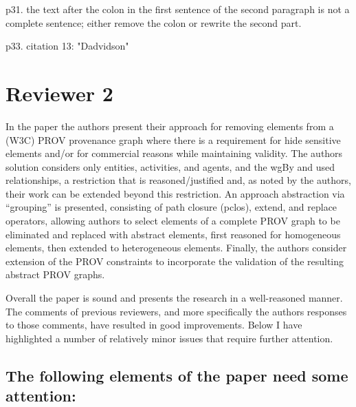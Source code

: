 \documentclass{article}
\begin{document}
p31. the text after the colon in the first sentence of the second paragraph is not a complete sentence; either remove the colon or rewrite the second part.

p33. citation 13: "Dadvidson"


\section*{Reviewer 2}


In the paper the authors present their approach for removing elements from a (W3C) PROV provenance graph where there is a requirement for hide sensitive elements and/or for commercial reasons while maintaining validity.  The authors solution considers only entities, activities, and agents, and the wgBy and used relationships, a restriction that is reasoned/justified and, as noted by the authors, their work can be extended beyond this restriction.  An approach abstraction via “grouping” is presented, consisting of path closure (pclos), extend, and replace operators, allowing authors to select elements of a complete PROV graph to be eliminated and replaced with abstract elements, first reasoned for homogeneous elements, then extended to heterogeneous elements.  Finally, the authors consider extension of the PROV constraints to incorporate the validation of the resulting abstract PROV graphs.

Overall the paper is sound and presents the research in a well-reasoned manner.  The comments of previous reviewers, and more specifically the authors responses to those comments, have resulted in good improvements.  Below I have highlighted a number of relatively minor issues that require further attention.

\subsection*{The following elements of the paper need some attention:}
\end{document}
